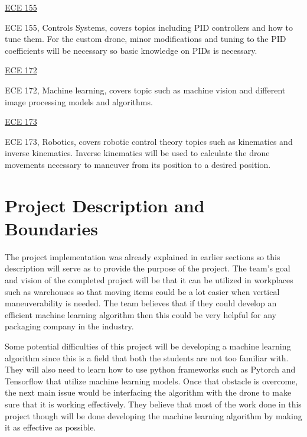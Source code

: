 \documentclass[12pt,onecolumn]{IEEEtran}			%
\begin{document}
\vspace{6pt} 
\underline{ECE 155}
\vspace{6pt} 

ECE 155, Controls Systems, covers topics including PID controllers and how to tune them. For the custom drone, minor modifications and tuning to the PID coefficients will be necessary so basic knowledge on PIDs is necessary.

\vspace{6pt} 
\underline{ECE 172}
\vspace{6pt} 

ECE 172, Machine learning, covers topic such as machine vision and different image processing models and algorithms.

\vspace{6pt} 
\underline{ECE 173}
\vspace{6pt} 
 
ECE 173, Robotics, covers robotic control theory topics such as kinematics and inverse kinematics. Inverse kinematics will be used to calculate the drone movements necessary to maneuver from its position to a desired position.
 
\section{Project Description and Boundaries}

The project implementation was already explained in earlier sections so this description will serve as to provide the purpose of the project. The team's goal and vision of the completed project will be that it can be utilized in workplaces such as warehouses so that moving items could be a lot easier when vertical maneuverability is needed. The team believes that if they could develop an efficient machine learning algorithm then this could be very helpful for any packaging company in the industry. 

Some potential difficulties of this project will be developing a machine learning algorithm since this is a field that both the students are not too familiar with. They will also need to learn how to use python frameworks such as Pytorch and Tensorflow that utilize machine learning models. Once that obstacle is overcome, the next main issue would be interfacing the algorithm with the drone to make sure that it is working effectively. They believe that most of the work done in this project though will be done developing the machine learning algorithm by making it as effective as possible. 
\end{document}
